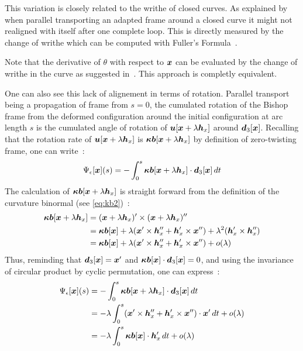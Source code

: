 This variation is closely related to the writhe of closed curves. As explained by  when parallel transporting an adapted frame around a closed curve it might not realigned with itself after one complete loop. This  is directly measured by the change of writhe which can be computed with Fuller's Formula~\cite{Fuller1978}.

Note that the derivative of $\theta$ with respect to $\boldsymbol{x}$ can be evaluated by the change of writhe in the curve as suggested in~\cite{deVries2005}. This approach is completly equivalent.

One can also see this lack of alignement in terms of rotation. Parallel transport being a propagation of frame from $s = 0$, the cumulated rotation of the Bishop frame from the deformed configuration around the initial configuration at arc length $s$ is the cumulated angle of rotation of $\boldsymbol{u}[\boldsymbol{x} + \lambda\boldsymbol{h}_x]$ around $\boldsymbol{d}_3[\boldsymbol{x}]$. Recalling that the rotation rate of $\boldsymbol{u}[\boldsymbol{x} + \lambda\boldsymbol{h}_x]$ is $\boldsymbol{\kappa b}[\boldsymbol{x} + \lambda\boldsymbol{h}_x]$ by definition of zero-twisting frame, one can write~:
\begin{equation}
	\Psi_\epsilon[\boldsymbol{x}](s) =
	-\int_0^s \boldsymbol{\kappa b}[\boldsymbol{x} + \lambda\boldsymbol{h}_x] \cdot \boldsymbol{d}_3[\boldsymbol{x}] \,dt
\end{equation}
The calculation of $\boldsymbol{\kappa b}[\boldsymbol{x} + \lambda\boldsymbol{h}_x]$ is straight forward from the definition of the curvature binormal (see \cref{eq:kb2})~:
\begin{equation}
	\begin{aligned}
	\boldsymbol{\kappa b}[\boldsymbol{x} + \lambda\boldsymbol{h}_x]
	&= (\boldsymbol{x} + \lambda\boldsymbol{h}_x)' \times (\boldsymbol{x} + \lambda\boldsymbol{h}_x)'' \\
	&= \boldsymbol{\kappa b}[\boldsymbol{x}] + \lambda(\boldsymbol{x}'\times\boldsymbol{h}''_x + \boldsymbol{h}'_x\times\boldsymbol{x}'') + \lambda^2(\boldsymbol{h}'_x \times \boldsymbol{h}''_x) \\
	&= \boldsymbol{\kappa b}[\boldsymbol{x}] + \lambda(\boldsymbol{x}'\times\boldsymbol{h}''_x + \boldsymbol{h}'_x\times\boldsymbol{x}'') + o(\lambda)
	\end{aligned}
\end{equation}
Thus, reminding that $\boldsymbol{d}_3[\boldsymbol{x}] = \boldsymbol{x}'$ and $\boldsymbol{\kappa b}[\boldsymbol{x}]\cdot\boldsymbol{d}_3[\boldsymbol{x}] = 0$, and using the invariance of circular product by cyclic permutation, one can express~:
\begin{equation}
	\begin{aligned}
		\Psi_\epsilon[\boldsymbol{x}](s)
		&= -\int_0^s \boldsymbol{\kappa b}[\boldsymbol{x} + \lambda\boldsymbol{h}_x] \cdot \boldsymbol{d}_3[\boldsymbol{x}] \,dt\\
		&= - \lambda \int_0^s (\boldsymbol{x}'\times\boldsymbol{h}''_x + \boldsymbol{h}'_x\times\boldsymbol{x}'') \cdot \boldsymbol{x}' \,dt + o(\lambda)\\
		&= - \lambda \int_0^s \boldsymbol{\kappa b}[\boldsymbol{x}]\cdot\boldsymbol{h}'_x \,dt + o(\lambda)\\
	\end{aligned}
\end{equation}
